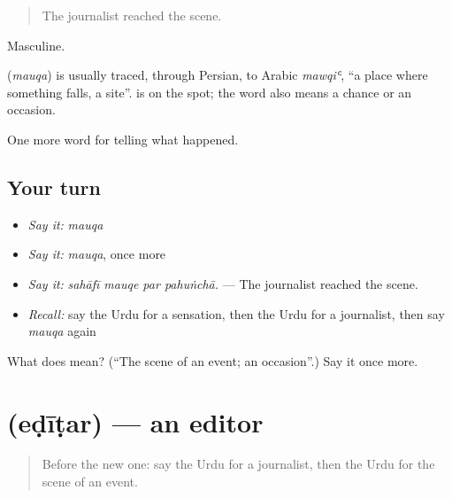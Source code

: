 \begin{quote}
The journalist reached the scene.
\end{quote}

Masculine.

\begin{cousinweb}
\textbf{} (\emph{mauqa}) is usually traced, through Persian, to Arabic \emph{mawqiʿ}, \textquotedblleft{}a place where something falls, a site\textquotedblright{}. \textbf{ } is on the spot; the word also means a chance or an occasion.
\end{cousinweb}

\begin{grammarlens}[title={What you've built}]
One more word for telling what happened.
\end{grammarlens}

\subsection*{Your turn}
\begin{itemize}
\raggedright
  \item \emph{Say it:} \emph{mauqa}
  \item \emph{Say it:} \emph{mauqa}, once more
  \item \emph{Say it:} \emph{sahāfī mauqe par pahuṅchā.} — The journalist reached the scene.
  \item \emph{Recall:} say the Urdu for a sensation, then the Urdu for a journalist, then say \emph{mauqa} again
\end{itemize}

\begin{tcolorbox}[breakable,colback=teal!4,colframe=teal!35!black,title={Before you move on}]
What does  mean? (\textquotedblleft{}The scene of an event; an occasion\textquotedblright{}.) Say it once more.
\end{tcolorbox}
\section[\texorpdfstring{\ur{ایڈیٹر} (eḍīṭar)}{ایڈیٹر (eḍīṭar)}]{ (eḍīṭar) — an editor}

\label{lesson:UR-C301-editar}



\begin{quote}
Before the new one: say the Urdu for a journalist, then the Urdu for the scene of an event.
\end{quote}

